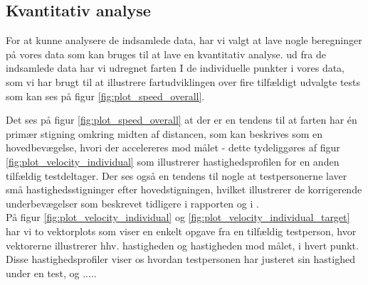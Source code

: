 \subsection*{Kvantitativ analyse}
For at kunne analysere de indsamlede data, har vi valgt at lave nogle beregninger på vores data som kan bruges til at lave en kvantitativ analyse. ud fra de indsamlede data har vi udregnet farten I de individuelle punkter i vores data, som vi har brugt til at illustrere fartudviklingen over fire tilfældigt udvalgte tests som kan ses på figur \ref{fig:plot_speed_overall}.

Det ses på figur \ref{fig:plot_speed_overall} at der er en tendens til at farten har én primær stigning omkring midten af distancen, som kan beskrives som en hovedbevægelse, hvori der accelereres mod målet - dette tydeliggøres af figur \ref{fig:plot_velocity_individual} som illustrerer hastighedsprofilen for en anden tilfældig testdeltager. Der ses også en tendens til nogle at testpersonerne laver små hastighedsstigninger efter hovedstigningen, hvilket illustrerer de korrigerende underbevægelser som beskrevet tidligere i rapporten og i \cite{meyer1988}.\\

På figur \ref{fig:plot_velocity_individual} og \ref{fig:plot_velocity_individual_target} har vi to vektorplots som viser en enkelt opgave fra en tilfældig testperson, hvor vektorerne illustrerer hhv. hastigheden og hastigheden mod målet, i hvert punkt. Disse hastighedsprofiler viser os hvordan testpersonen har justeret sin hastighed under en test, og .....

